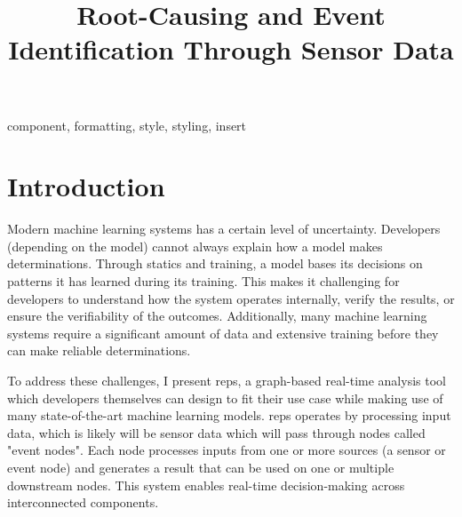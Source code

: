 \documentclass[conference]{IEEEtran}
\begin{document}
	\title{Root-Causing and Event Identification Through Sensor Data}
	
	\author{
	}
	
	\maketitle
	
	\begin{abstract}
	\end{abstract}
	
	\begin{IEEEkeywords}
		component, formatting, style, styling, insert
	\end{IEEEkeywords}
	
	\section{Introduction}	
		Modern machine learning systems has a certain level of uncertainty. Developers (depending on the model) cannot always explain how a model makes determinations.  Through statics and training, a model bases its decisions on patterns it has learned during its training. This makes it challenging for developers to understand how the system operates internally, verify the results, or ensure the verifiability of the outcomes. Additionally, many machine learning systems require a significant amount of data and extensive training before they can make reliable determinations.
		
		To address these challenges, I present \gls{reps}, a graph-based real-time analysis tool which developers themselves can design to fit their use case while making use of many state-of-the-art machine learning models. \gls{reps} operates by processing input data, which is likely will be sensor data which will pass through nodes called "event nodes". Each node processes inputs from one or more sources (a sensor or event node) and generates a result that can be used on one or multiple downstream nodes. This system enables	real-time decision-making across interconnected components.
		
\end{document}
